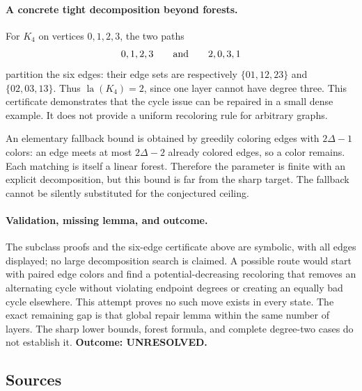 \documentclass[11pt,a4paper]{article}
\begin{document}
\paragraph{A concrete tight decomposition beyond forests.}
For $K_4$ on vertices $0,1,2,3$, the two paths
\[
                      0,1,2,3\qquad\hbox{and}\qquad2,0,3,1
\]
partition the six edges: their edge sets are respectively
$\{01,12,23\}$ and $\{02,03,13\}$. Thus
$\operatorname{la}(K_4)=2$, since one layer cannot have degree three.
This certificate demonstrates that the cycle issue can be repaired
in a small dense example. It does not provide a uniform recoloring
rule for arbitrary graphs.

An elementary fallback bound is obtained by greedily coloring edges
with $2\Delta-1$ colors: an edge meets at most $2\Delta-2$ already
colored edges, so a color remains. Each matching is itself a linear
forest. Therefore the parameter is finite with an explicit decomposition,
but this bound is far from the sharp target. The fallback cannot be
silently substituted for the conjectured ceiling.

\paragraph{Validation, missing lemma, and outcome.}
The subclass proofs and the six-edge certificate above are symbolic,
with all edges displayed; no large decomposition search is claimed.
A possible route would start with paired edge colors and find a
potential-decreasing recoloring that removes an alternating cycle
without violating endpoint degrees or creating an equally bad cycle
elsewhere. This attempt proves no such move exists in every state.
The exact remaining gap is that global repair lemma within the same
number of layers. The sharp lower bounds, forest formula, and complete
degree-two cases do not establish it. \textbf{Outcome: UNRESOLVED.}

\subsection{Sources}
\end{document}
